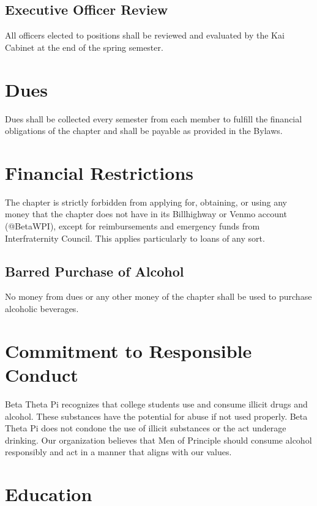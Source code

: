 \subsection{Executive Officer Review}

All officers elected to positions shall be reviewed and evaluated by the Kai Cabinet at the end of the spring semester.


\section{Dues}

Dues shall be collected every semester from each member to fulfill the financial obligations of the chapter and shall be payable as provided in the Bylaws.

\section{Financial Restrictions}

The chapter is strictly forbidden from applying for, obtaining, or using any money that the chapter does not have in its Billhighway or Venmo account (@BetaWPI), except for reimbursements and emergency funds from Interfraternity Council.
This applies particularly to loans of any sort.

\subsection{Barred Purchase of Alcohol}

No money from dues or any other money of the chapter shall be used to purchase alcoholic beverages.


\section{Commitment to Responsible Conduct}

Beta Theta Pi recognizes that college students use and consume illicit drugs and alcohol.
These substances have the potential for abuse if not used properly.
Beta Theta Pi does not condone the use of illicit substances or the act underage drinking.
Our organization believes that Men of Principle should consume alcohol responsibly and act in a manner that aligns with our values.

\section{Education}

